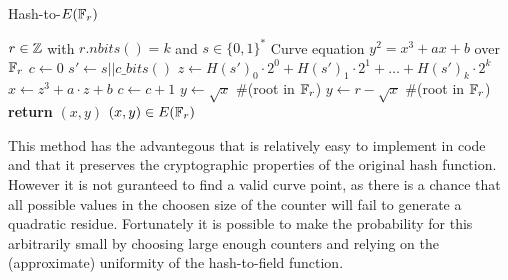 \begin{algorithm}\caption{Hash-to-$E(\mathbb{F}_r)$}
\label{alg_projective_group_law}
\begin{algorithmic}[0]
\Require $r \in \mathbb{Z}$ with $r.nbits()=k$ and $s\in\{0,1\}^*$
\Require Curve equation $y^2 = x^3 + ax +b$ over $\mathbb{F}_r$
\State $c \gets 0$
\Repeat
\State $s' \gets s||c\_bits()$
\State $z \gets H(s')_0\cdot 2^0 + H(s')_1\cdot 2^1 + \ldots + H(s')_{k}\cdot 2^{k}$
\State $x\gets z^3 + a\cdot z + b$
\State $c\gets c+1$
\State $y \gets \sqrt{x}$ \#(root in $\mathbb{F}_r$)
\Else
\State $y \gets r-\sqrt{x}$ \#(root in $\mathbb{F}_r$)
\EndIf
\State \textbf{return} $(x,y)$
\EndProcedure
\Ensure $(x,y)\in E(\mathbb{F}_r)$
\end{algorithmic}
\end{algorithm}

This method has the advantegous that is relatively easy to implement in code and that it preserves the cryptographic properties of the original hash function. However it is not guranteed to find a valid curve point, as there is a chance that all possible values in the choosen size of the counter will fail to generate a quadratic residue. Fortunately it is possible to make the probability for this arbitrarily small by choosing large enough counters and relying on the (approximate) uniformity of the hash-to-field function.



